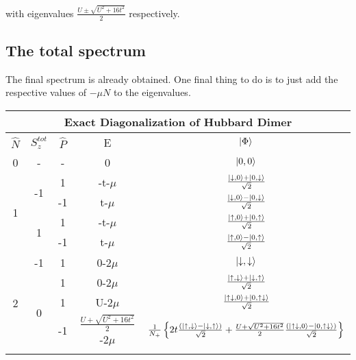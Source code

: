 \documentclass[12pt]{article}
\begin{document}
with eigenvalues \(\frac{U\pm\sqrt{U^2+16 t^2}}{2}\) respectively.
\subsection{The total spectrum}
The final spectrum is already obtained. One final thing to do is to just add the respective values of \(-\mu N\) to the eigenvalues.
\begin{table}[htb]
\begin{center}
\begin{tabular}{@{}ccccc@{}}
\toprule
\multicolumn{5}{c}{\bf{Exact Diagonalization of Hubbard Dimer}} \\
\toprule
\(\hat{N}\) & \(S_z^{tot}\) & \(\hat{P}\) & E & \(\ket{\Phi}\)\\
\toprule
0 & - & - & 0 & \(\ket{0,0}\) \\ \toprule
\multicolumn{1}{c}{\multirow{4}{*}{1}} & \multirow{2}{*}{-1} & 1  & -t-\(\mu\)  & \(\frac{\ket{\downarrow,0}+\ket{0,\downarrow}}{\sqrt{2}}\)  \\ \cmidrule(l){3-5} 
\multicolumn{1}{c}{}                   &                     & -1 & t-\(\mu\)   & \(\frac{\ket{\downarrow,0}-\ket{0,\downarrow}}{\sqrt{2}}\)  \\ \cmidrule(l){2-5}
\multicolumn{1}{c}{}                   & \multirow{2}{*}{1}  & 1  & -t-\(\mu\)  & \(\frac{\ket{\uparrow,0}+\ket{0,\uparrow}}{\sqrt{2}}\)  \\ \cmidrule(l){3-5} 
\multicolumn{1}{c}{}                   &                     & -1 & t-\(\mu\)   & \(\frac{\ket{\uparrow,0}-\ket{0,\uparrow}}{\sqrt{2}}\)  \\ \toprule
\multirow{6}{*}{2}                     & -1                  & 1  & 0-\(2\mu\)   & \(\ket{\downarrow,\downarrow}\)  \\ \cmidrule(l){2-5} 
                                       & \multirow{4}{*}{0}  & 1  & 0-\(2\mu\)   & \(\frac{\ket{\uparrow,\downarrow}+\ket{\downarrow,\uparrow}}{\sqrt{2}}\)  \\ \cmidrule(l){3-5} 
                                       &                     & 1  & U-\(2\mu\)   & \(\frac{\ket{\uparrow\downarrow,0}+\ket{0,\uparrow\downarrow}}{\sqrt{2}}\)  \\ \cmidrule(l){3-5} 
                                       &                     & -1 & \(\frac{U+\sqrt{U^2+16 t^2}}{2}\)-\(2\mu\)    & \(\frac{1}{N_+}\left\{{2t \frac{(\ket{\uparrow,\downarrow}-\ket{\downarrow,\uparrow})}{\sqrt{2}} + \frac{U+\sqrt{U^2+16 t^2}}{2} \frac{(\ket{\uparrow\downarrow,0}-\ket{0,\uparrow\downarrow})}{\sqrt{2}}}\right\}\)  \\ \cmidrule(l){3-5} 

\end{tabular}
\end{center}
\end{table}
\end{document}

